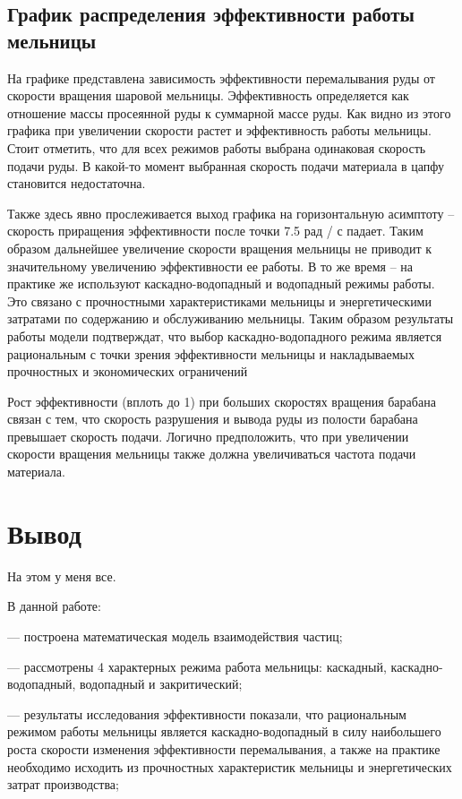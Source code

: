 \documentclass[a4paper]{article}
\begin{document}
\subsection{График распределения эффективности работы мельницы}

На графике представлена зависимость эффективности перемалывания руды от скорости вращения шаровой мельницы. 
Эффективность определяется как отношение массы просеянной руды к суммарной массе руды.
Как видно из этого графика при увеличении скорости растет и эффективность работы мельницы.
Стоит отметить, что для всех режимов работы выбрана одинаковая скорость подачи руды.
В какой-то момент выбранная скорость подачи материала в цапфу становится недостаточна.

Также здесь явно прослеживается выход графика на горизонтальную асимптоту -- скорость приращения эффективности после точки 7.5 рад / с падает. 
Таким образом дальнейшее увеличение скорости вращения мельницы не приводит к значительному увеличению эффективности ее работы. 
В то же время -- на практике же используют каскадно-водопадный и водопадный режимы работы.
Это связано с прочностными характеристиками мельницы и энергетическими затратами по содержанию и обслуживанию мельницы.
Таким образом результаты работы модели подтверждат, что выбор каскадно-водопадного режима является рациональным с точки зрения эффективности мельницы и накладываемых прочностных и экономических ограничений

Рост эффективности (вплоть до 1) при больших скоростях вращения барабана связан с тем, что скорость разрушения и вывода руды из полости барабана превышает скорость подачи.
Логично предположить, что при увеличении скорости вращения мельницы также должна увеличиваться частота подачи материала.


\section{Вывод}

На этом у меня все.

В данной работе:

	--- построена математическая модель взаимодействия частиц;

	--- рассмотрены 4 характерных режима работа мельницы: каскадный, каскадно-водопадный, водопадный и закритический;
	
	--- результаты исследования эффективности показали, что рациональным режимом работы мельницы является каскадно-водопадный в силу наибольшего роста скорости изменения эффективности перемалывания, а также на практике необходимо исходить из прочностных характеристик мельницы и энергетических затрат производства;
	
\end{document}
